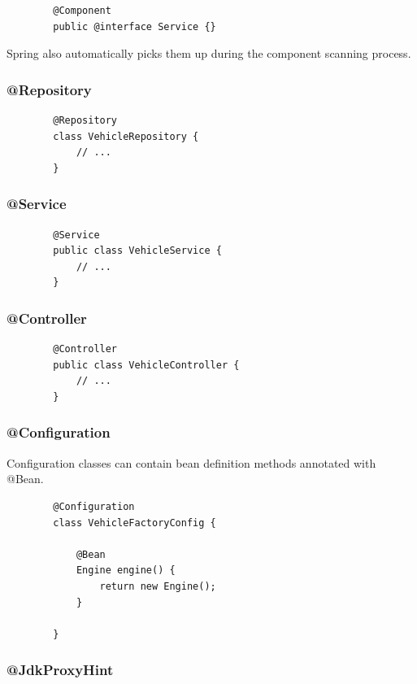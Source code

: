 \documentclass{scrartcl}
\begin{document}
      \begin{lstlisting}
        @Component
        public @interface Service {}
    \end{lstlisting}

    Spring also automatically picks them up during the component scanning process.


\subsubsection{@Repository}

    \begin{lstlisting}
        @Repository
        class VehicleRepository {
            // ...
        }
    \end{lstlisting}

\subsubsection{@Service}

    \begin{lstlisting}
        @Service
        public class VehicleService {
            // ...
        }
    \end{lstlisting}

\subsubsection{@Controller}

    \begin{lstlisting}
        @Controller
        public class VehicleController {
            // ...
        }
    \end{lstlisting}

\subsubsection{@Configuration}

    Configuration classes can contain bean definition methods annotated with @Bean.

    \begin{lstlisting}
        @Configuration
        class VehicleFactoryConfig {

            @Bean
            Engine engine() {
                return new Engine();
            }

        }
    \end{lstlisting}

\subsubsection{@JdkProxyHint}
\end{document}
